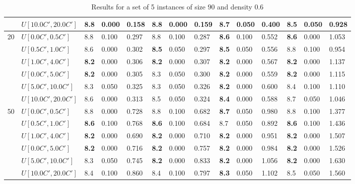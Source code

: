 \begin{table}[h]
{\begin{tabular}{|l|l||l|l|l||l|l|l||l|l|l||l|l|l|}
       & $U[10.0C',20.0C']$ & 8.8 & 0.000 & 0.158 & 8.8 & 0.000 & 0.159 & 8.7 & 0.050 & 0.400 & \textbf{8.5} & 0.050 & 0.928 \\
      \hline\hline
      \multirow{6}{*}{20} & $U[0.0C',0.5C']$ & 8.8 & 0.100 & 0.297 & 8.8 & 0.100 & 0.287 & \textbf{8.6} & 0.100 & 0.552 & \textbf{8.6} & 0.000 & 1.053 \\
       & $U[0.5C',1.0C']$ & 8.6 & 0.000 & 0.302 & \textbf{8.5} & 0.050 & 0.297 & \textbf{8.5} & 0.050 & 0.556 & 8.8 & 0.100 & 0.954 \\
       & $U[1.0C',4.0C']$ & \textbf{8.2} & 0.000 & 0.306 & \textbf{8.2} & 0.000 & 0.307 & \textbf{8.2} & 0.000 & 0.567 & \textbf{8.2} & 0.000 & 1.137 \\
       & $U[0.0C',5.0C']$ & \textbf{8.2} & 0.000 & 0.305 & 8.3 & 0.050 & 0.300 & \textbf{8.2} & 0.000 & 0.559 & \textbf{8.2} & 0.000 & 1.115 \\
       & $U[5.0C',10.0C']$ & 8.3 & 0.050 & 0.325 & 8.3 & 0.050 & 0.326 & \textbf{8.2} & 0.000 & 0.600 & 8.4 & 0.100 & 1.110 \\
       & $U[10.0C',20.0C']$ & 8.6 & 0.000 & 0.313 & 8.5 & 0.050 & 0.324 & \textbf{8.4} & 0.000 & 0.588 & 8.7 & 0.050 & 1.046 \\
      \hline\hline
      \multirow{6}{*}{50} & $U[0.0C',0.5C']$ & 8.8 & 0.000 & 0.728 & 8.8 & 0.100 & 0.682 & \textbf{8.7} & 0.050 & 0.980 & 8.8 & 0.100 & 1.377 \\
       & $U[0.5C',1.0C']$ & \textbf{8.6} & 0.100 & 0.768 & \textbf{8.6} & 0.100 & 0.684 & 8.7 & 0.050 & 0.892 & \textbf{8.6} & 0.100 & 1.436 \\
       & $U[1.0C',4.0C']$ & \textbf{8.2} & 0.000 & 0.690 & \textbf{8.2} & 0.000 & 0.710 & \textbf{8.2} & 0.000 & 0.951 & \textbf{8.2} & 0.000 & 1.507 \\
       & $U[0.0C',5.0C']$ & \textbf{8.2} & 0.000 & 0.716 & \textbf{8.2} & 0.000 & 0.757 & \textbf{8.2} & 0.000 & 0.984 & \textbf{8.2} & 0.000 & 1.526 \\
       & $U[5.0C',10.0C']$ & 8.3 & 0.050 & 0.745 & \textbf{8.2} & 0.000 & 0.833 & \textbf{8.2} & 0.000 & 1.056 & \textbf{8.2} & 0.000 & 1.630 \\
       & $U[10.0C',20.0C']$ & 8.4 & 0.100 & 0.860 & 8.4 & 0.100 & 0.797 & \textbf{8.3} & 0.050 & 1.102 & 8.5 & 0.050 & 1.560 \\
      \hline
      \end{tabular}
      }
      \caption{Results for a set of 5 instances of size $90$ and density $0.6$}
      \label{tab:pcpn90p6}\end{table}

